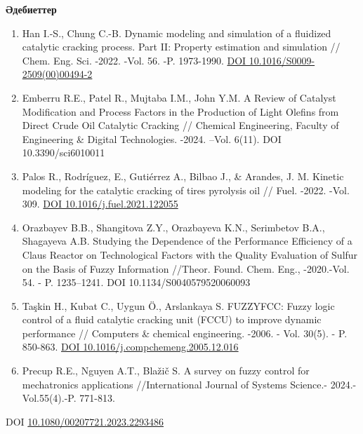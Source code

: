 \begin{center}
{\bfseries Әдебиеттер}
\end{center}

\begin{references}
\begin{enumerate}
\def\labelenumi{\arabic{enumi}.}
\item
  Han I.-S., Chung C.-B. Dynamic modeling and simulation of a fluidized
  catalytic cracking process. Part II: Property estimation and
  simulation // Chem. Eng. Sci. -2022. -Vol. 56. -P. 1973-1990.
  \href{https://doi.org/10.1016/S0009-2509(00)00494-2}{DOI
  10.1016/S0009-2509(00)00494-2}
\item
  Emberru R.E., Patel R., Mujtaba I.M., John Y.M. A Review of Catalyst
  Modification and Process Factors in the Production of Light Olefins
  from Direct Crude Oil Catalytic Cracking // Chemical Engineering,
  Faculty of Engineering \& Digital Technologies. -2024. --Vol. 6(11).
  DOI 10.3390/sci6010011
\item
  Palos R., Rodríguez, E., Gutiérrez A., Bilbao J., \& Arandes, J. M.
  Kinetic modeling for the catalytic cracking of tires pyrolysis oil //
  Fuel. -2022. -Vol. 309.
  \href{https://doi.org/10.1016/j.fuel.2021.122055}{DOI
  10.1016/j.fuel.2021.122055}
\item
  Orazbayev B.B., Shangitova Z.Y., Orazbayeva K.N., Serimbetov B.A.,
  Shagayeva A.B. Studying the Dependence of the Performance Efficiency
  of a Claus Reactor on Technological Factors with the Quality
  Evaluation of Sulfur on the Basis of Fuzzy Information //Theor. Found.
  Chem. Eng., -2020.-Vol. 54. - P. 1235--1241. DOI
  10.1134/S0040579520060093
\item
  Taşkin H., Kubat C., Uygun Ö., Arslankaya S. FUZZYFCC: Fuzzy logic
  control of a fluid catalytic cracking unit (FCCU) to improve dynamic
  performance // Computers \& chemical engineering. -2006. - Vol. 30(5).
  - P. 850-863.
  \href{https://doi.org/10.1016/j.compchemeng.2005.12.016}{DOI
  10.1016/j.compchemeng.2005.12.016}
\item
  Precup R.E., Nguyen A.T., Blažič S. A survey on fuzzy control for
  mechatronics applications //International Journal of Systems Science.-
  2024.- Vol.55(4).-P. 771-813.
\end{enumerate}

DOI
\href{https://doi.org/10.1080/00207721.2023.2293486}{10.1080/00207721.2023.2293486}


\end{references}

